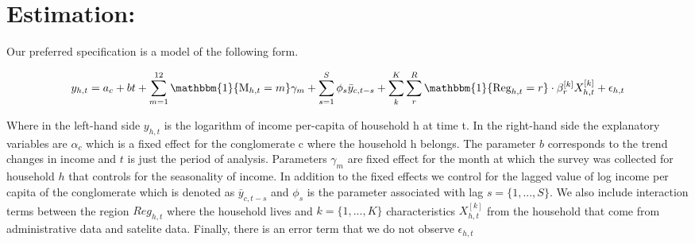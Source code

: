\section{Estimation:}

Our preferred specification is a model of the following form. 

\begin{align*}
    y_{h,t} = a_c + b t + \sum_{m = 1}^{12} \mathbbm{1}\{\text{M}_{h,t} = m\}\gamma_{m} + \sum_{s=1}^S\phi_s \bar{y}_{c,t-s}  + \sum_k^K\sum_r^R \mathbbm{1}\{\text{Reg}_{h,t} = r\}\cdot \beta^{[k]}_r X^{[k]}_{h,t} + \epsilon_{h,t}
\end{align*}


Where in the left-hand side $y_{h,t}$ is the logarithm of income per-capita of household h at time t. In the right-hand side the explanatory variables are $\alpha_c$ which is a fixed effect for the conglomerate c where the household h belongs. The parameter $b$ corresponds to the trend changes in income and $t$ is just the period of analysis. Parameters $\gamma_m$ are fixed effect for the month at which the survey was collected for household $h$ that controls for the seasonality of income. In addition to the fixed effects we control for the lagged value of log income per capita of the conglomerate which is denoted as $\bar{y}_{c,t-s}$ and $\phi_s$ is the parameter associated with lag $s = \{1,...,S\}$. We also include interaction terms between the region $Reg_{h,t}$ where the household lives and $k=\{1,...,K\}$ characteristics $X^{[k]}_{h,t}$ from the household that come from administrative data and satelite data. Finally, there is an error term that we do not observe $\epsilon_{h,t}$